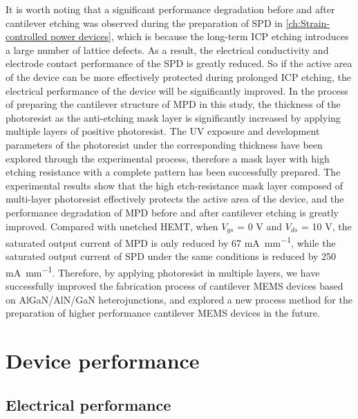 It  is worth noting that a significant performance degradation  before and after cantilever  etching was observed during the preparation of SPD  in \autoref{ch:Strain-controlled power devices}, which is because the long-term ICP etching introduces a large number of lattice  defects. As a result, the electrical conductivity and electrode contact performance of the SPD is greatly reduced. So if the active area of ​​the device can be more effectively protected during prolonged ICP etching, the electrical performance of the device will be significantly improved. In the process of preparing the cantilever  structure of MPD in this study, the thickness of the photoresist as the anti-etching mask layer is significantly increased by applying multiple layers of  positive photoresist. The UV exposure and development parameters of the photoresist under the corresponding thickness have been explored through the experimental process, therefore a mask layer with high etching resistance with a complete pattern  has been successfully prepared. The experimental results show that the high etch-resistance mask layer composed of multi-layer photoresist effectively protects the active area of ​​the device, and the performance degradation of MPD before and after cantilever  etching is greatly improved. Compared with unetched HEMT, when $V_{gs}$ = 0 \unit{V} and $V_{ds}$ = 10 \unit{V}, the saturated output current of MPD is only reduced by 67 \unit{\mA\per\mm}, while the saturated output current of SPD  under the same conditions is reduced by 250 \unit{\mA\per\mm}. Therefore, by applying photoresist in multiple layers, we have successfully improved the fabrication process  of cantilever  MEMS devices based on  AlGaN/AlN/GaN heterojunctions, and explored a new process method for the preparation of higher performance cantilever  MEMS devices in the future.

\section{Device performance}
\label{sec:Device performance}

\subsection{Electrical performance}
\label{sec:Electrical performance}

